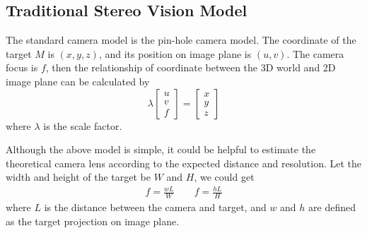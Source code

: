 \subsection{Traditional Stereo Vision Model}
The standard camera model is the pin-hole camera model. The coordinate of the target $M$ is $(x,y,z)$, and its position on image plane is $(u,v)$. The camera focus is $f$, then the relationship of coordinate between the 3D world and 2D image plane can be calculated by 
\begin{equation}
	\lambda\left[ {\begin{array}{*{20}{c}}
			u \\ 
			v \\ 
			f 
	\end{array}} \right] =\left[ {\begin{array}{*{20}{c}}
			x \\ 
			y \\ 
			z 
	\end{array}} \right]
\end{equation}
where $\lambda$ is the scale factor. 

%

Although the above model is simple, it could be helpful to estimate the theoretical camera lens according to the expected distance and resolution. Let the width and height of the target be $W$ and $H$, we could get
\begin{align}
	f=\frac{wL}{W} \qquad f=\frac{hL}{H}
\end{align}
where $L$ is the distance between the camera and target, and $w$ and $h$ are defined as the target projection on image plane.
 
